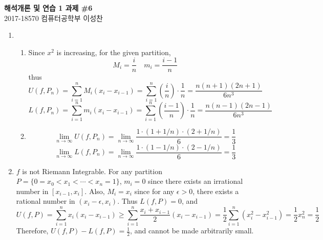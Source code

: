 \documentclass[11pt]{report}
\newcommand{\ra}{\rightarrow}
\begin{document}
\begin{center}
\textbf{\Large 해석개론 및 연습 1 과제 \#6}\\
\large 2017-18570 컴퓨터공학부 이성찬
\end{center}
\begin{enumerate}
\item
\begin{enumerate}
	\item Since $x^2$ is increasing, for the given partition,
	$$M_i = \frac{i}{n} \quad m_i = \frac{i-1}{n}$$
	thus
	$$U(f, P_n) = \sum_{i=1}^{n} M_i (x_i-x_{i-1}) = \sum_{i=1}^n \left(\frac{i}{n}\right) \cdot \frac{1}{n} = \frac{n(n+1)(2n+1)}{6n^3}$$
	$$L(f, P_n) = \sum_{i=1}^{n} m_i (x_i-x_{i-1}) = \sum_{i=1}^n \left(\frac{i-1}{n}\right) \cdot \frac{1}{n} = \frac{n(n-1)(2n-1)}{6n^3}$$
	\item $$\lim_{n\ra\infty} U(f, P_n) = \lim_{n\ra\infty} \frac{1\cdot (1 + 1/n) \cdot (2 + 1/n)}{6} = \frac{1}{3}$$
	$$\lim_{n\ra\infty} L(f, P_n) = \lim_{n\ra\infty} \frac{1\cdot (1 - 1/n) \cdot (2 - 1/n)}{6} = \frac{1}{3}$$
\end{enumerate}

\item $f$ is not Riemann Integrable. For any partition $P = \{0 = x_0 < x_1 < \cdots <x_n = 1\}$,
$m_i = 0$ since there exists an irrational number in $[x_{i-1}, x_i]$. Also, $M_i=x_i$ since for any $\epsilon>0$, there exists a rational number in $(x_i-\epsilon, x_i)$. Thus $L(f, P) = 0$, and $$U(f, P) = \sum_{i=1}^n x_i(x_i-x_{i-1}) \geq \sum_{i=1}^n \frac{x_{i}+x_{i-1}}{2}(x_i-x_{i-1}) = \frac{1}{2} \sum_{i=1}^n (x_i^2 - x_{i-1}^2) = \frac{1}{2}x_n^2 = \frac{1}{2}$$
Therefore, $U(f, P) - L(f, P) = \frac{1}{2}$, and cannot be made arbitrarily small.


\end{enumerate}
\end{document}
